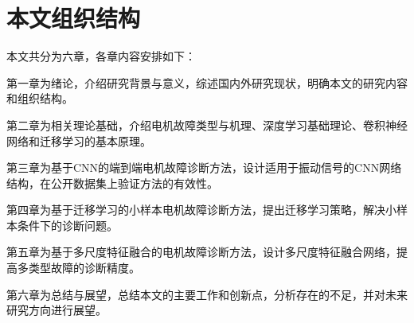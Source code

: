 \section{本文组织结构}

本文共分为六章，各章内容安排如下：

第一章为绪论，介绍研究背景与意义，综述国内外研究现状，明确本文的研究内容和组织结构。

第二章为相关理论基础，介绍电机故障类型与机理、深度学习基础理论、卷积神经网络和迁移学习的基本原理。

第三章为基于CNN的端到端电机故障诊断方法，设计适用于振动信号的CNN网络结构，在公开数据集上验证方法的有效性。

第四章为基于迁移学习的小样本电机故障诊断方法，提出迁移学习策略，解决小样本条件下的诊断问题。

第五章为基于多尺度特征融合的电机故障诊断方法，设计多尺度特征融合网络，提高多类型故障的诊断精度。

第六章为总结与展望，总结本文的主要工作和创新点，分析存在的不足，并对未来研究方向进行展望。